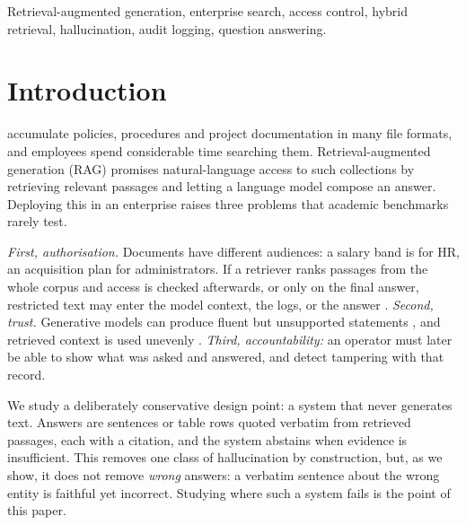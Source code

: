 \documentclass[journal]{IEEEtran}
\begin{document}
\begin{IEEEkeywords}
Retrieval-augmented generation, enterprise search, access control, hybrid retrieval, hallucination, audit logging, question answering.
\end{IEEEkeywords}

\section{Introduction}
 accumulate policies, procedures and project documentation in many file formats, and employees spend considerable time searching them. Retrieval-augmented generation (RAG) \cite{lewis2020rag,gao2023ragsurvey} promises natural-language access to such collections by retrieving relevant passages and letting a language model compose an answer. Deploying this in an enterprise raises three problems that academic benchmarks rarely test.

\emph{First, authorisation.} Documents have different audiences: a salary band is for HR, an acquisition plan for administrators. If a retriever ranks passages from the whole corpus and access is checked afterwards, or only on the final answer, restricted text may enter the model context, the logs, or the answer \cite{zeng2024privacy,position2025participant}. \emph{Second, trust.} Generative models can produce fluent but unsupported statements \cite{ji2023hallucination,huang2023hallucination}, and retrieved context is used unevenly \cite{liu2023lost}. \emph{Third, accountability:} an operator must later be able to show what was asked and answered, and detect tampering with that record.

We study a deliberately conservative design point: a system that never generates text. Answers are sentences or table rows quoted verbatim from retrieved passages, each with a citation, and the system abstains when evidence is insufficient. This removes one class of hallucination by construction, but, as we show, it does not remove \emph{wrong} answers: a verbatim sentence about the wrong entity is faithful yet incorrect. Studying where such a system fails is the point of this paper.
\end{document}
